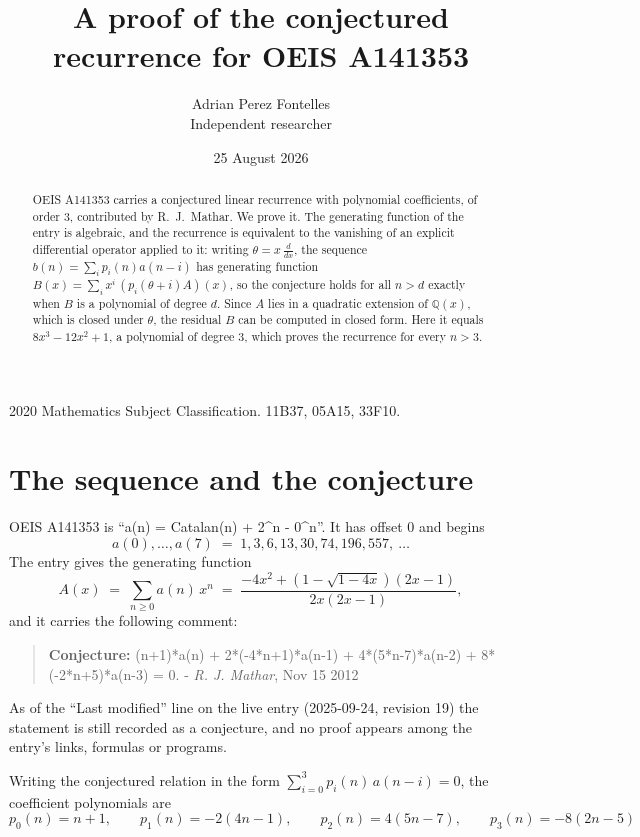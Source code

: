 \documentclass[11pt,a4paper]{article}
\title{A proof of the conjectured recurrence for OEIS A141353}
\author{Adrian Perez Fontelles\\ \small Independent researcher}
\date{25 August 2026}
\theoremstyle{plain}
\theoremstyle{definition}
\begin{document}
\maketitle

\begin{abstract}
OEIS A141353 carries a conjectured linear recurrence with polynomial coefficients, of
order 3, contributed by R.~J.~Mathar. We prove it. The generating function of the
entry is algebraic, and the recurrence is equivalent to the vanishing of an explicit
differential operator applied to it: writing $\theta=x\,\frac{d}{dx}$, the sequence
$b(n)=\sum_{i}p_{i}(n)a(n-i)$ has generating function
$B(x)=\sum_{i}x^{i}\,(p_{i}(\theta+i)A)(x)$, so the conjecture holds for all $n>d$ exactly
when $B$ is a polynomial of degree $d$. Since $A$ lies in a quadratic extension of
$\mathbb{Q}(x)$, which is closed under $\theta$, the residual $B$ can be computed in
closed form. Here it equals $8 x^{3} - 12 x^{2} + 1$, a polynomial of degree $3$, which proves
the recurrence for every $n>3$.
\end{abstract}

\noindent\small 2020 Mathematics Subject Classification. 11B37, 05A15, 33F10.\normalsize

\section{The sequence and the conjecture}

OEIS A141353 is ``a(n) = Catalan(n) + 2\^{}n - 0\^{}n''. It has offset $0$ and begins
\[
a(0),\dots,a(7)\;=\;1, 3, 6, 13, 30, 74, 196, 557,\ \dots
\]
The entry gives the generating function
\begin{equation}\label{eq:gf}
A(x)\;=\;\sum_{n\ge 0} a(n)\,x^{n}\;=\;\frac{- 4 x^{2} + \left(1 - \sqrt{1 - 4 x}\right) \left(2 x - 1\right)}{2 x \left(2 x - 1\right)} ,
\end{equation}
and it carries the following comment:
\begin{quote}\small
\textbf{Conjecture:} (n+1)*a(n) + 2*(-4*n+1)*a(n-1) + 4*(5*n-7)*a(n-2) + 8*(-2*n+5)*a(n-3) = 0. - \emph{R. J. Mathar}, Nov 15 2012
\end{quote}
As of the ``Last modified'' line on the live entry (2025-09-24, revision 19) the
statement is still recorded as a conjecture, and no proof appears among the entry's links,
formulas or programs.

Writing the conjectured relation in the form $\sum_{i=0}^{3}p_{i}(n)\,a(n-i)=0$,
the coefficient polynomials are
\[
p_{0}(n)=n + 1,\qquad p_{1}(n)=- 2 \left(4 n - 1\right),\qquad p_{2}(n)=4 \left(5 n - 7\right),\qquad p_{3}(n)=- 8 \left(2 n - 5\right)
\]
\end{document}
